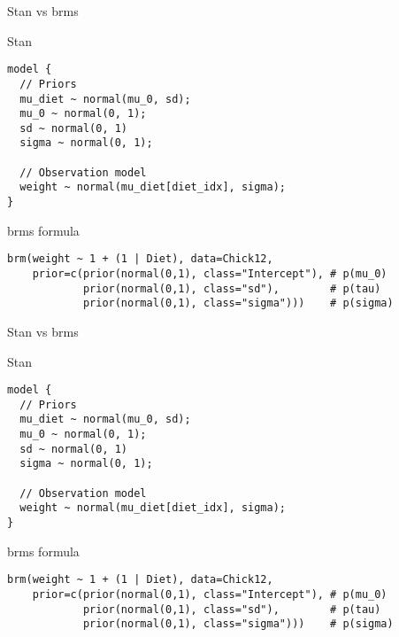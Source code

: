 \documentclass[finnish,english,t]{beamer}
\begin{document}
\begin{frame}[fragile]{Stan vs brms}

  \vspace{-0.5\baselineskip}

  Stan
  
\vspace{-0.5\baselineskip}
{\small
\begin{verbatim}
model {
  // Priors
  mu_diet ~ normal(mu_0, sd);
  mu_0 ~ normal(0, 1);
  sd ~ normal(0, 1)
  sigma ~ normal(0, 1);
  
  // Observation model
  weight ~ normal(mu_diet[diet_idx], sigma);
}
\end{verbatim}

  brms formula
  \vspace{-0.5\baselineskip}
\begin{verbatim}
brm(weight ~ 1 + (1 | Diet), data=Chick12,
    prior=c(prior(normal(0,1), class="Intercept"), # p(mu_0)
            prior(normal(0,1), class="sd"),        # p(tau)
            prior(normal(0,1), class="sigma")))    # p(sigma)
\end{verbatim}
}

\end{frame}

\begin{frame}[fragile]{Stan vs brms}

  \vspace{-0.5\baselineskip}

  Stan
  
\vspace{-0.5\baselineskip}
{\small
\begin{verbatim}
model {
  // Priors
  mu_diet ~ normal(mu_0, sd);
  mu_0 ~ normal(0, 1);
  sd ~ normal(0, 1)
  sigma ~ normal(0, 1);
  
  // Observation model
  weight ~ normal(mu_diet[diet_idx], sigma);
}
\end{verbatim}

  brms formula
  \vspace{-0.5\baselineskip}
\begin{verbatim}
brm(weight ~ 1 + (1 | Diet), data=Chick12,
    prior=c(prior(normal(0,1), class="Intercept"), # p(mu_0)
            prior(normal(0,1), class="sd"),        # p(tau)
            prior(normal(0,1), class="sigma")))    # p(sigma)
\end{verbatim}
}

\end{frame}
\end{document}
